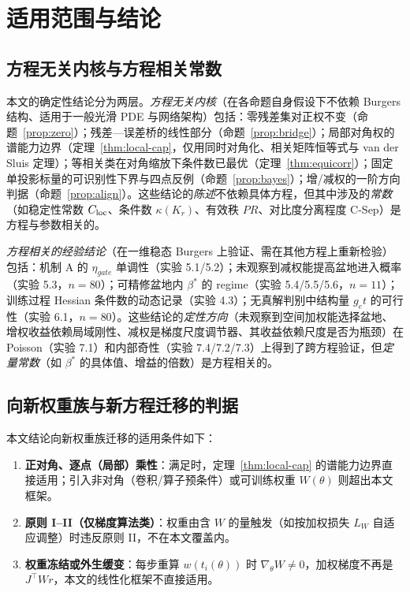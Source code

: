 \documentclass[fontset=windows,11pt]{ctexart}
\newcommand{\W}{W}
\numberwithin{equation}{section}
\begin{document}
\FloatBarrier

\section{适用范围与结论}\label{sec:conclusion}

\subsection{方程无关内核与方程相关常数}\label{sec:scope}

本文的确定性结论分为两层。\emph{方程无关内核}（在各命题自身假设下不依赖 Burgers 结构、适用于一般光滑 PDE 与网络架构）包括：零残差集对正权不变（命题~\ref{prop:zero}）；残差—误差桥的线性部分（命题~\ref{prop:bridge}）；局部对角权的谱能力边界（定理~\ref{thm:local-cap}，仅用同时对角化、相关矩阵恒等式与 van der Sluis 定理）；等相关类在对角缩放下条件数已最优（定理~\ref{thm:equicorr}）；固定单投影标量的可识别性下界与四点反例（命题~\ref{prop:bayes}）；增/减权的一阶方向判据（命题~\ref{prop:align}）。这些结论的\emph{陈述}不依赖具体方程，但其中涉及的\emph{常数}（如稳定性常数 $C_{\rm loc}$、条件数 $\kappa(K_r)$、有效秩 $PR$、对比度分离程度 C-Sep）是方程与参数相关的。

\emph{方程相关的经验结论}（在一维稳态 Burgers 上验证、需在其他方程上重新检验）包括：机制 A 的 $\eta_{gate}$ 单调性（实验 5.1/5.2）；未观察到减权能提高盆地进入概率（实验 5.3，$n=80$）；可精修盆地内 $\beta^*$ 的 regime（实验 5.4/5.5/5.6，$n=11$）；训练过程 Hessian 条件数的动态记录（实验 4.3）；无真解判别中结构量 $g_et$ 的可行性（实验 6.1，$n=80$）。这些结论的\emph{定性方向}（未观察到空间加权能选择盆地、增权收益依赖局域刚性、减权是梯度尺度调节器、其收益依赖尺度是否为瓶颈）在 Poisson（实验 7.1）和内部奇性（实验 7.4/7.2/7.3）上得到了跨方程验证，但\emph{定量常数}（如 $\beta^*$ 的具体值、增益的倍数）是方程相关的。

\subsection{向新权重族与新方程迁移的判据}\label{sec:migration}

本文结论向新权重族迁移的适用条件如下：
\begin{enumerate}[label=(\arabic*),leftmargin=2em,itemsep=1pt]
\item \textbf{正对角、逐点（局部）乘性}：满足时，定理~\ref{thm:local-cap} 的谱能力边界直接适用；引入非对角（卷积/算子预条件）或可训练权重 $\W(\theta)$ 则超出本文框架。
\item \textbf{原则 I--II（仅梯度算法类）}：权重由含 $\W$ 的量触发（如按加权损失 $L_\W$ 自适应调整）时违反原则 II，不在本文覆盖内。
\item \textbf{权重冻结或外生缓变}：每步重算 $w(t_i(\theta))$ 时 $\nabla_\theta\W\ne0$，加权梯度不再是 $J^\top\W r$，本文的线性化框架不直接适用。
\end{enumerate}
\end{document}
